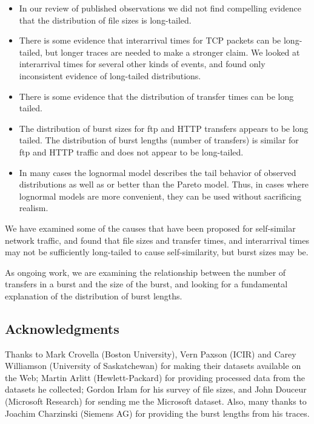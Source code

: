 \documentclass{elsart}
\begin{document}
\begin {itemize}

\item In our review of published observations we did not find
compelling evidence that the distribution of file sizes is
long-tailed.


\item There is some evidence that interarrival times for TCP packets
can be long-tailed, but longer traces are needed to make a stronger
claim.  We looked at interarrival times for several other kinds of
events, and found only inconsistent evidence of long-tailed
distributions.

\item There is some evidence that the distribution of transfer times
can be long tailed.

\item The distribution of burst sizes for ftp and HTTP
transfers appears to be long tailed.  The distribution of burst
lengths (number of transfers) is similar for ftp and HTTP traffic and
does not appear to be long-tailed.

\item In many cases the lognormal model describes the tail behavior of
observed distributions as well as or better than the Pareto model.
Thus, in cases where lognormal models are more convenient, they can
be used without sacrificing realism.

\end{itemize}

We have examined some of the causes that have been proposed for
self-similar network traffic, and found that file sizes and transfer
times, and interarrival times may not be sufficiently long-tailed to
cause self-similarity, but burst sizes may be.

As ongoing work, we are examining the relationship between the number
of transfers in a burst and the size of the burst, and looking for
a fundamental explanation of the distribution of burst lengths.


\subsection*{Acknowledgments}

Thanks to Mark Crovella (Boston University), Vern Paxson (ICIR)
and Carey Williamson (University of Saskatchewan) for making their
datasets available on the Web; Martin Arlitt (Hewlett-Packard) for
providing processed data from the datasets he collected; Gordon Irlam
for his survey of file sizes, and John Douceur (Microsoft Research)
for sending me the Microsoft dataset.  Also, many thanks to Joachim
Charzinski (Siemens AG) for providing the burst lengths from his
traces.
\end{document}
